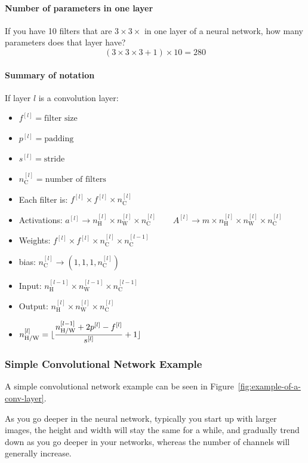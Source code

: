 \documentclass[UTF8]{article}
\newcommand{\Vector}[1]{\boldsymbol{\mathit{#1}}}   %
\newcommand{\Matrix}[1]{\boldsymbol{\mathit{#1}}}   %
\DeclarePairedDelimiter\floor{\lfloor}{\rfloor}
\begin{document}
\paragraph{Number of parameters in one layer}
If you have 10 filters that are $3 \times 3 \times$ in one layer of a neural network, how many
parameters does that layer have?
$$ (3 \times 3 \times 3 + 1) \times 10 = 280 $$

\paragraph{Summary of notation}
If layer $l$ is a convolution layer:
\begin{itemize}
    \item $f^{[l]} = \text{filter size}$
    \item $p^{[l]} = \text{padding}$
    \item $s^{[l]} = \text{stride}$
    \item $n_{\text{C}}^{[l]} = \text{number of filters}$
    \item Each filter is: $f^{[l]} \times f^{[l]} \times n_{\text{C}}^{[l]}$
    \item Activations: $\Vector{a}^{[l]} \rightarrow n_{\text{H}}^{[l]} \times n_{\text{W}}^{[l]} \times
    n_{\text{C}}^{[l]} \qquad \Matrix{A}^{[l]} \rightarrow m \times n_{\text{H}}^{[l]} \times
    n_{\text{W}}^{[l]} \times n_{\text{C}}^{[l]}$
    \item Weights: $f^{[l]} \times f^{[l]} \times n_{\text{C}}^{[l]} \times n_{\text{C}}^{[l-1]}$
    \item bias: $n_{\text{C}}^{[l]} \rightarrow (1, 1, 1, n_{\text{C}}^{[l]})$
    \item Input: $n_{\text{H}}^{[l-1]} \times n_{\text{W}}^{[l-1]} \times n_{\text{C}}^{[l-1]}$
    \item Output: $n_{\text{H}}^{[l]} \times n_{\text{W}}^{[l]} \times n_{\text{C}}^{[l]}$
    \item $\displaystyle n_{\text{H/W}}^{[l]} = \floor{\frac{n_{\text{H/W}}^{[l-1]} + 2p^{[l]}
    - f^{[l]}}{s^{[l]}} + 1}$
\end{itemize}

\subsubsection{Simple Convolutional Network Example}
A simple convolutional network example can be seen in Figure~\ref{fig:example-of-a-conv-layer}.

As you go deeper in the neural network, typically you start up with larger images, the height
and width will stay the same for a while, and gradually trend down as you go deeper in your
networks, whereas the number of channels will generally increase.
\end{document}
